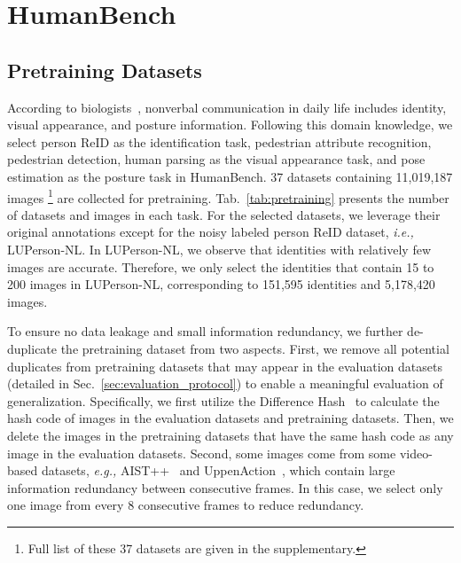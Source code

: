 \documentclass[10pt,twocolumn,letterpaper]{article}
\begin{document}
\section{HumanBench}


\subsection{Pretraining Datasets} \label{sec:pretrain_task}
According to biologists~\cite{darwin1998expression}, nonverbal communication in daily life includes identity, visual appearance, and posture information. Following this domain knowledge, we select person ReID as the identification task, pedestrian attribute recognition, pedestrian detection, human parsing as the visual appearance task, and pose estimation as the posture task in HumanBench. 37 datasets containing 11,019,187 images \footnote{Full list of these 37 datasets are given in the supplementary.} are collected  for pretraining. Tab.~\ref{tab:pretraining} presents the number of datasets and images in each task. For the selected datasets, we leverage their original annotations except for  the noisy labeled person ReID dataset, \emph{i.e.,} LUPerson-NL. In LUPerson-NL, we observe that identities with relatively few images are accurate. Therefore, we only select the identities that contain 15 to 200 images in LUPerson-NL, corresponding to 151,595 identities and 5,178,420 images. 

To ensure no data leakage and small information redundancy, we further de-duplicate the pretraining dataset from two aspects.
First, we remove all potential duplicates from pretraining datasets that may appear in the evaluation datasets (detailed in Sec.~\ref{sec:evaluation_protocol}) to enable a meaningful evaluation of generalization. Specifically, we first utilize the Difference Hash~\cite{suryawanshi2018image} to calculate the hash code of images in the evaluation datasets and pretraining datasets. Then, we delete the images in the pretraining datasets that have the same hash code as any image in the evaluation datasets. Second, some images come from some video-based datasets, \emph{e.g.,} AIST++~\cite{li2021ai} and UppenAction~\cite{zhang2013actemes},  which contain large information redundancy between consecutive frames. In this case, we select only one image from every 8 consecutive frames to reduce redundancy. 
\end{document}
